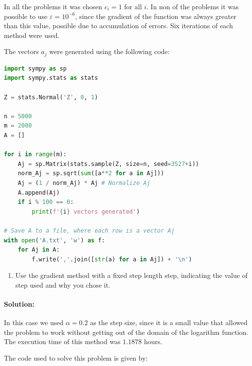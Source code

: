 \documentclass[10pt]{article}
\begin{document}
In all the problems it was chosen $c_i=1$ for all $i$. In non of the problems it was possible to use $\varepsilon = 10^{-6}$, since the gradient of the function was always greater than this value, possible due to accumulation of errors. Six iterations 
of each method were used.

The vectors $a_j$ were generated using the following code:

\begin{lstlisting}[language=Python]
import sympy as sp
import sympy.stats as stats

Z = stats.Normal('Z', 0, 1)

n = 5000
m = 2000
A = []

for i in range(m):
    Aj = sp.Matrix(stats.sample(Z, size=n, seed=3527+i))
    norm_Aj = sp.sqrt(sum([a**2 for a in Aj]))
    Aj = (1 / norm_Aj) * Aj # Normalize Aj
    A.append(Aj)
    if i % 100 == 0:
        print(f'{i} vectors generated')

# Save A to a file, where each row is a vector Aj
with open('A.txt', 'w') as f:
    for Aj in A:
        f.write(','.join([str(a) for a in Aj]) + '\n')
\end{lstlisting}

\begin{enumerate}[label=(\alph*)]
    \item Use the gradient method with a fixed step length step, indicating the value of step used and why you chose it.
\end{enumerate}

\paragraph{Solution:}

In this case we used $\alpha = 0.2$ as the step size, since it is a small value that allowed the problem to work without getting out of the domain of the logarithm function. The execution time
of this method was $1.1878$ hours. 

The code used to solve this problem is given by:
\end{document}
